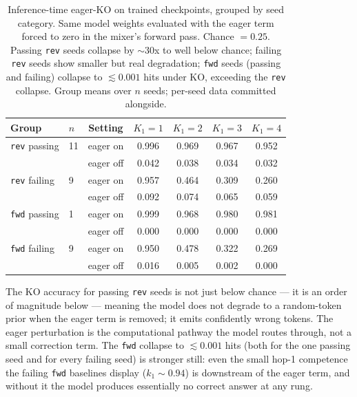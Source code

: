 \documentclass[11pt]{article}
\newcommand{\claim}[1]{#1}
\begin{document}
\begin{table}[h]
\centering
\caption{Inference-time eager-KO on trained checkpoints, grouped by
seed category. Same model weights evaluated with the eager term
forced to zero in the mixer's forward pass. Chance $= 0.25$. Passing
\texttt{rev} seeds collapse by $\sim$30x to well below chance;
failing \texttt{rev} seeds show smaller but real degradation;
\texttt{fwd} seeds (passing and failing) collapse to $\lesssim
0.001$ hits under KO, exceeding the \texttt{rev} collapse. Group
means over $n$ seeds; per-seed data committed alongside.}
\label{tab:inference-ko}
\begin{tabular}{llccccc}
\toprule
Group & $n$ & Setting & $K_1{=}1$ & $K_1{=}2$ & $K_1{=}3$ & $K_1{=}4$ \\
\midrule
\texttt{rev} passing & 11 & eager on  & 0.996 & 0.969 & 0.967 & 0.952 \\
                     &    & eager off & 0.042 & 0.038 & 0.034 & 0.032 \\
\midrule
\texttt{rev} failing & 9  & eager on  & 0.957 & 0.464 & 0.309 & 0.260 \\
                     &    & eager off & 0.092 & 0.074 & 0.065 & 0.059 \\
\midrule
\texttt{fwd} passing & 1  & eager on  & 0.999 & 0.968 & 0.980 & 0.981 \\
                     &    & eager off & 0.000 & 0.000 & 0.000 & 0.000 \\
\midrule
\texttt{fwd} failing & 9  & eager on  & 0.950 & 0.478 & 0.322 & 0.269 \\
                     &    & eager off & 0.016 & 0.005 & 0.002 & 0.000 \\
\bottomrule
\end{tabular}
\end{table}

The KO accuracy for passing \texttt{rev} seeds is not just below chance
--- it is an order of magnitude below --- meaning the model does not
degrade to a random-token prior when the eager term is removed; it
emits confidently wrong tokens. The eager perturbation is the
computational pathway the model routes through, not a small correction
term. The \texttt{fwd} collapse to $\lesssim 0.001$ hits (both for the
one passing seed and for every failing seed) is stronger still: even
the small hop-1 competence the failing \texttt{fwd} baselines display
(\claim{$k_1 \sim 0.94$}) is downstream of the eager term, and without
it the model produces essentially no correct answer at any rung.
\end{document}
